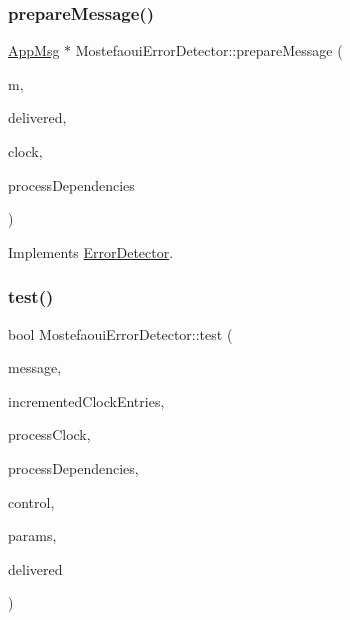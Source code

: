 \subsubsection{\texorpdfstring{prepare\+Message()}{prepareMessage()}}
{\footnotesize\ttfamily \hyperlink{classAppMsg}{App\+Msg} $\ast$ Mostefaoui\+Error\+Detector\+::prepare\+Message (\begin{DoxyParamCaption}\item[{\hyperlink{classAppMsg}{App\+Msg} $\ast$}]{m,  }\item[{const vector$<$ \hyperlink{structures_8h_a7e7bdc1d2fff8a9436f2f352b2711ed6}{message\+Info} $>$ \&}]{delivered,  }\item[{const \hyperlink{classProbabilisticClock}{Probabilistic\+Clock} \&}]{clock,  }\item[{const \hyperlink{classTotalDependencies}{Total\+Dependencies} \&}]{process\+Dependencies }\end{DoxyParamCaption})\hspace{0.3cm}{\ttfamily [virtual]}}



Implements \hyperlink{classErrorDetector_a8cac1f6ac6803da4379df7891789c490}{Error\+Detector}.

\mbox{\label{classMostefaouiErrorDetector_a293f6cf144526bc8694fc4f1fc0daeb5}} 
\subsubsection{\texorpdfstring{test()}{test()}}
{\footnotesize\ttfamily bool Mostefaoui\+Error\+Detector\+::test (\begin{DoxyParamCaption}\item[{\hyperlink{structures_8h_a7e7bdc1d2fff8a9436f2f352b2711ed6}{message\+Info}}]{message,  }\item[{const vector$<$ unsigned int $>$ \&}]{incremented\+Clock\+Entries,  }\item[{const \hyperlink{classProbabilisticClock}{Probabilistic\+Clock} \&}]{process\+Clock,  }\item[{const \hyperlink{classTotalDependencies}{Total\+Dependencies} \&}]{process\+Dependencies,  }\item[{\hyperlink{classController}{Controller} $\ast$}]{control,  }\item[{\hyperlink{classSimulationParameters}{Simulation\+Parameters} $\ast$}]{params,  }\item[{const vector$<$ \hyperlink{structures_8h_a7e7bdc1d2fff8a9436f2f352b2711ed6}{message\+Info} $>$ \&}]{delivered }\end{DoxyParamCaption})\hspace{0.3cm}{\ttfamily [virtual]}}



